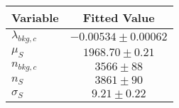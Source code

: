 \begin{tabular}[t]{lc}
\hline
Variable &Fitted Value\\
\hline\hline
$\lambda_{bkg,c}$&$-0.00534\pm0.00062$\\
\hline
$\mu_{S}$&$1968.70\pm0.21$\\
\hline
$n_{bkg,c}$&$3566\pm88$\\
\hline
$n_{S}$&$3861\pm90$\\
\hline
$\sigma_{S}$&$9.21\pm0.22$\\
\hline
\end{tabular}